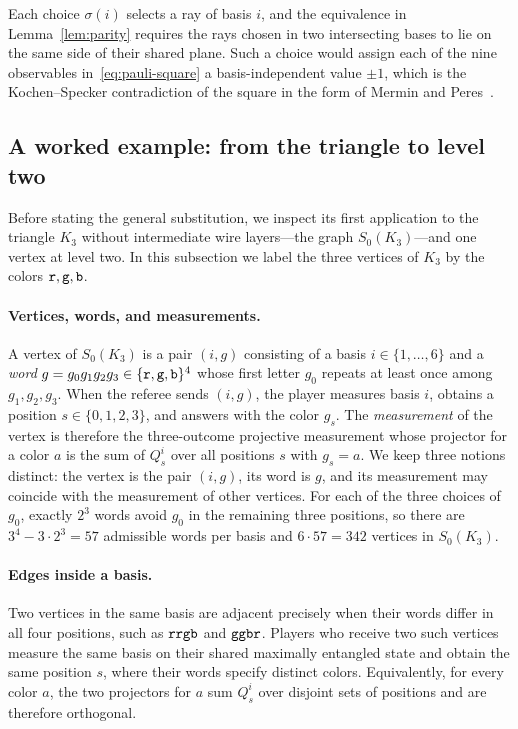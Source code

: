 Each choice $\sigma(i)$ selects a ray of basis $i$, and the equivalence in Lemma~\ref{lem:parity} requires the rays chosen in two intersecting bases to lie on the same side of their shared plane. Such a choice would assign each of the nine observables in~\eqref{eq:pauli-square} a basis-independent value $\pm1$, which is the Kochen--Specker contradiction of the square in the form of Mermin and Peres~\cite{KS,Mermin,Peres}.

\subsection{A worked example: from the triangle to level two}\label{sec:example}

Before stating the general substitution, we inspect its first application to the triangle $K_3$ without intermediate wire layers---the graph $S_0(K_3)$---and one vertex at level two. In this subsection we label the three vertices of $K_3$ by the colors $\mathtt{r},\mathtt{g},\mathtt{b}$.

\paragraph{Vertices, words, and measurements.}
A vertex of $S_0(K_3)$ is a pair $(i,g)$ consisting of a basis $i\in\{1,\ldots,6\}$ and a \emph{word} $g=g_0g_1g_2g_3\in\{\mathtt{r},\mathtt{g},\mathtt{b}\}^4$ whose first letter $g_0$ repeats at least once among $g_1,g_2,g_3$. When the referee sends $(i,g)$, the player measures basis $i$, obtains a position $s\in\{0,1,2,3\}$, and answers with the color $g_s$. The \emph{measurement} of the vertex is therefore the three-outcome projective measurement whose projector for a color $a$ is the sum of $Q^i_s$ over all positions $s$ with $g_s=a$. We keep three notions distinct: the vertex is the pair $(i,g)$, its word is $g$, and its measurement may coincide with the measurement of other vertices. For each of the three choices of $g_0$, exactly $2^3$ words avoid $g_0$ in the remaining three positions, so there are $3^4-3\cdot2^3=57$ admissible words per basis and $6\cdot57=342$ vertices in $S_0(K_3)$.

\paragraph{Edges inside a basis.}
Two vertices in the same basis are adjacent precisely when their words differ in all four positions, such as $\mathtt{rrgb}$ and $\mathtt{ggbr}$. Players who receive two such vertices measure the same basis on their shared maximally entangled state and obtain the same position $s$, where their words specify distinct colors. Equivalently, for every color $a$, the two projectors for $a$ sum $Q^i_s$ over disjoint sets of positions and are therefore orthogonal.

